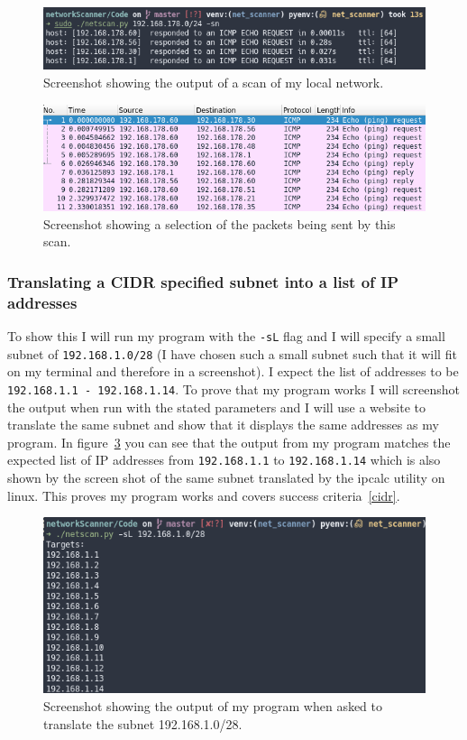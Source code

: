 \documentclass[titlepage]{article}
\let\Oldsubsubsection\subsubsection{}
\renewcommand{\subsubsection}{\FloatBarrier\Oldsubsubsection}
\begin{document}
\begin{figure}[H]
  \centering
  \includegraphics[width=\textwidth]{pingscantest.png}
  \caption{%
    Screenshot showing the output of a scan of my local network.
  }\label{lanscantest}
\end{figure}

\begin{figure}[H]
  \centering
  \includegraphics[width=\textwidth]{pingscantest_wireshark.png}
  \caption{%
    Screenshot showing a selection of the packets being sent by this scan.
  }\label{lanscanwireshark}
\end{figure}

\subsubsection{Translating a CIDR specified subnet into a list of IP addresses}
To show this I will run my program with the \verb|-sL| flag and I will specify
a small subnet of \verb|192.168.1.0/28| (I have chosen such a small subnet
such that it will fit on my terminal and therefore in a screenshot).
I expect the list of addresses to be \verb|192.168.1.1 - 192.168.1.14|.
To prove that my program works I will screenshot the output when run with the
stated parameters and I will use a website to translate the same subnet and show
that it displays the same addresses as my program.
In figure~\ref{cidrtest} you can see that the output from my program matches
the expected list of IP addresses from \verb|192.168.1.1| to \verb|192.168.1.14|
which is also shown by the screen shot of the same subnet translated by
the ipcalc utility on linux.
This proves my program works and covers success criteria~\ref{cidr}.

\begin{figure}[H]
  \centering
  \includegraphics[width=\textwidth]{iplist.png}
  \caption{%
    Screenshot showing the output of my program when asked to translate the subnet 192.168.1.0/28.
  }\label{cidrtest}
\end{figure}
\end{document}
